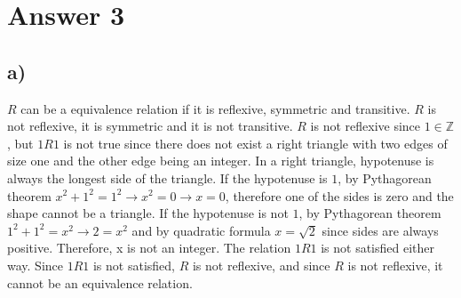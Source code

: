 \documentclass[12pt]{article}
\begin{document}
\section*{Answer 3}
\subsection*{a) }
$R$ can be a equivalence relation if it is reflexive, symmetric and transitive.
$R$ is not reflexive, it is symmetric and it is not transitive.
$R$ is not reflexive since $1 \in \mathbb{Z}$, but $1R1$ is not true since there does not exist a right triangle with two edges of size one and the other edge being an integer.
In a right triangle, hypotenuse is always the longest side of the triangle.
If the hypotenuse is $1$, by Pythagorean theorem $x^2 + 1^2 = 1^2 \to x^2 = 0 \to x = 0$, therefore one of the sides is zero and the shape cannot be a triangle.
If the hypotenuse is not $1$, by Pythagorean theorem $1^2 + 1^2 = x^2 \to 2 = x^2$ and by quadratic formula $x=\sqrt{2}$ since sides are always positive.
Therefore, x is not an integer.
The relation $1R1$ is not satisfied either way.
Since $1R1$ is not satisfied, $R$ is not reflexive, and since $R$ is not reflexive, it cannot be an equivalence relation.
\end{document}
